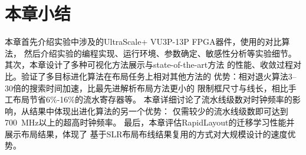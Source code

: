\section{本章小结}

本章首先介绍实验中涉及的UltraScale+ VU3P-13P FPGA器件，使用的对比算法，
然后介绍实验的编程实现、运行环境、参数确定、敏感性分析等实验细节。
其次，本章设计了多种可视化方法展示与state-of-the-art方法
的性能、收敛过程对比。验证了多目标进化算法在布局任务上相对其他方法的
优势：相对退火算法3--30倍的搜索时间加速，比最先进解析布局方法更小的
限制框尺寸与线长，相比手工布局节省6\%-16\%的流水寄存器等。
本章详细讨论了流水线级数对时钟频率的影响，从结果中体现出进化算法的另一个优势：
仅需较少的流水线级数即可达到700~MHz以上的超高时钟频率。
最后，本章评估RapidLayout的迁移学习性能并展示布局结果，体现了
基于SLR布局布线结果复用的方式对大规模设计的速度优势。










































































